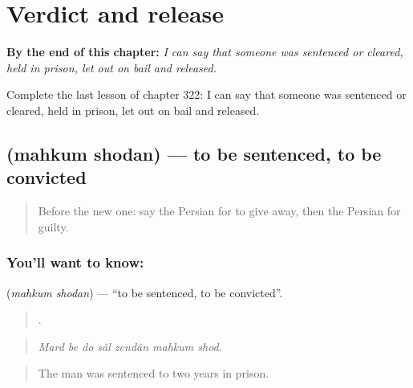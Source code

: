 
\chapter{Verdict and release}
\label{ch:fa-verdict-and-release}

\begin{chapteropening}
\textbf{By the end of this chapter:} \emph{I can say that someone was sentenced or cleared, held in prison, let out on bail and released.}

Complete the last lesson of chapter 322: I can say that someone was sentenced or cleared, held in prison, let out on bail and released.
\end{chapteropening}

\section[\texorpdfstring{\fa{محکوم} \fa{شدن} (mahkum shodan)}{محکوم شدن (mahkum shodan)}]{  (mahkum shodan) — to be sentenced, to be convicted}

\label{lesson:FA-C322-mahkum-shodan}



\begin{quote}
Before the new one: say the Persian for to give away, then the Persian for guilty.
\end{quote}

\subsection*{You'll want to know:  }
\textbf{ } (\emph{mahkum shodan}) — \textquotedblleft{}to be sentenced, to be convicted\textquotedblright{}.

\begin{quote}
      .
\end{quote}

\begin{quote}
\emph{Mard be do sâl zendân mahkum shod.}
\end{quote}

\begin{quote}
The man was sentenced to two years in prison.
\end{quote}

